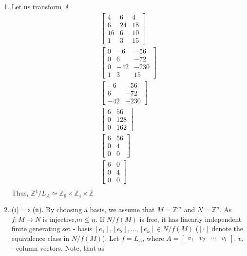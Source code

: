 \documentclass[8pt]{article} %
\begin{document}
\begin{enumerate}[label=(\arabic*)]
\item{Let us transform $A$
	\begin{gather*}
		\begin{bmatrix}
			4&6&4\\6&24&18\\16&6&10\\1&3&15
		\end{bmatrix}\tag{original matrix}\\
		\begin{bmatrix}
			0&-6&-56\\0&6&-72\\0&-42&-230\\1&3&15
		\end{bmatrix}\tag{row operations}\\
		\begin{bmatrix}
			-6&-56\\6&-72\\-42&-230
		\end{bmatrix}\tag{remove row and column}\\
		\begin{bmatrix}
			6&56\\0&128\\0&162
		\end{bmatrix}\tag{row operations}\\
		\begin{bmatrix}
			6&56\\0&4\\0&0
		\end{bmatrix}\tag{row operations}\\
		\begin{bmatrix}
			6&0\\0&4\\0&0
		\end{bmatrix}\tag{row operations}\\
	\end{gather*}
	Thus, $\mathbb{Z}^4/L_A\simeq \mathbb{Z}_6\times\mathbb{Z}_4\times\mathbb{Z}$
	}
\item{(i)$\implies$(ii). By choosing a basis, we assume that $M=\mathbb{Z}^m$ and $N=\mathbb{Z}^n$.
	As $f:M\mapsto N$ is injective,$m\leq n$.
	If $N/f(M)$ is free, it has linearly independent finite generating set - basis $[e_1],[e_2],\dots,[e_k]\in
	N/f(M)$ ($[\cdot]$ denote the equivalence class in $N/f(M)$). Let $f=L_A$, where
	$A=\begin{bmatrix}v_1&v_2&\cdots& v_l\end{bmatrix}$, $v_i$ - column vectors. Note, that as
}
\end{enumerate}
\end{document}
